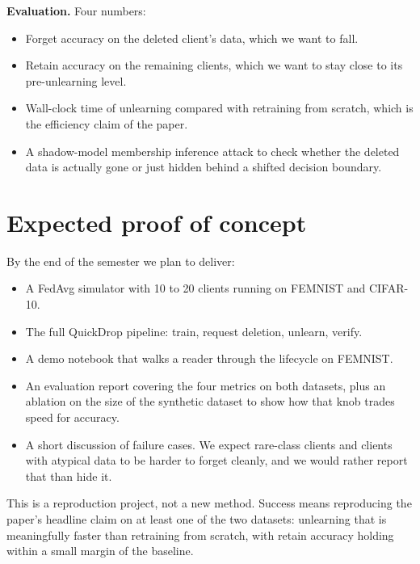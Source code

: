 \documentclass[11pt,a4paper]{article}
\begin{document}
\textbf{Evaluation.} Four numbers:
\begin{itemize}
    \item Forget accuracy on the deleted client's data, which we want to fall.
    \item Retain accuracy on the remaining clients, which we want to stay close to its pre-unlearning level.
    \item Wall-clock time of unlearning compared with retraining from scratch, which is the efficiency claim of the paper.
    \item A shadow-model membership inference attack to check whether the deleted data is actually gone or just hidden behind a shifted decision boundary.
\end{itemize}

\section*{Expected proof of concept}

By the end of the semester we plan to deliver:
\begin{itemize}
    \item A FedAvg simulator with 10 to 20 clients running on FEMNIST and CIFAR-10.
    \item The full QuickDrop pipeline: train, request deletion, unlearn, verify.
    \item A demo notebook that walks a reader through the lifecycle on FEMNIST.
    \item An evaluation report covering the four metrics on both datasets, plus an ablation on the size of the synthetic dataset to show how that knob trades speed for accuracy.
    \item A short discussion of failure cases. We expect rare-class clients and clients with atypical data to be harder to forget cleanly, and we would rather report that than hide it.
\end{itemize}

This is a reproduction project, not a new method. Success means reproducing the paper's headline claim on at least one of the two datasets: unlearning that is meaningfully faster than retraining from scratch, with retain accuracy holding within a small margin of the baseline.
\end{document}
